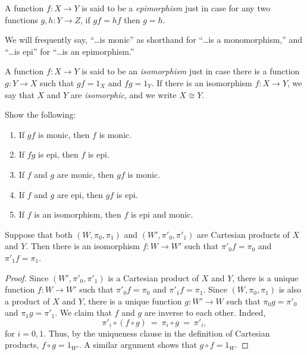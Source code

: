 \begin{defn} A function $f:X\to Y$ is said to be a \emph{epimorphism}
  just in case for any two functions $g,h:Y\to Z$, if $gf=hf$ then
  $g=h$.  \end{defn}

We will frequently say, ``\dots is monic'' as shorthand for ``\dots is
a monomorphism,'' and ``\dots is epi'' for ``\dots is an
epimorphism.''

\begin{defn} A function $f:X\to Y$ is said to be an \emph{isomorphism}
  just in case there is a function $g:Y\to X$ such that $gf=1_X$ and
  $fg=1_Y$.  If there is an isomorphism $f:X\to Y$, we say that $X$
  and $Y$ are \emph{isomorphic}, and we write $X\cong Y$.  \end{defn}

\begin{exercise} \label{comps} Show the following:
\begin{enumerate}
\item If $gf$ is monic, then $f$ is monic.
\item If $fg$ is epi, then $f$ is epi.
\item If $f$ and $g$ are monic, then $gf$ is monic.
\item If $f$ and $g$ are epi, then $gf$ is epi.
\item If $f$ is an isomorphism, then $f$ is epi and
  monic. \end{enumerate} \end{exercise}

\begin{prop} Suppose that both $(W,\pi _0,\pi _1)$ and
  $(W',\pi '_0,\pi '_1)$ are Cartesian products of $X$ and $Y$.  Then
  there is an isomorphism $f:W\to W'$ such that $\pi '_0f=\pi _0$ and
  $\pi '_1f=\pi _1$. \end{prop}

\begin{proof} Since $(W',\pi '_0,\pi '_1)$ is a Cartesian product of
  $X$ and $Y$, there is a unique function $f:W\to W'$ such that
  $\pi '_0f= \pi _0$ and $\pi '_1f= \pi _1$.  Since
  $(W,\pi _0,\pi _1)$ is also a product of $X$ and $Y$, there is a
  unique function $g:W'\to W$ such that $\pi _0g=\pi '_0$ and
  $\pi _1g=\pi '_1$.  We claim that $f$ and $g$ are inverse to each
  other.  Indeed,
  \[ \pi '_i\circ (f\circ g) \: = \: \pi _i\circ g \: = \: \pi '_i ,\]
  for $i=0,1$.  Thus, by the uniqueness clause in the definition of
  Cartesian products, $f\circ g=1_{W'}$.  A similar argument shows
  that $g\circ f=1_W$.  \end{proof}


